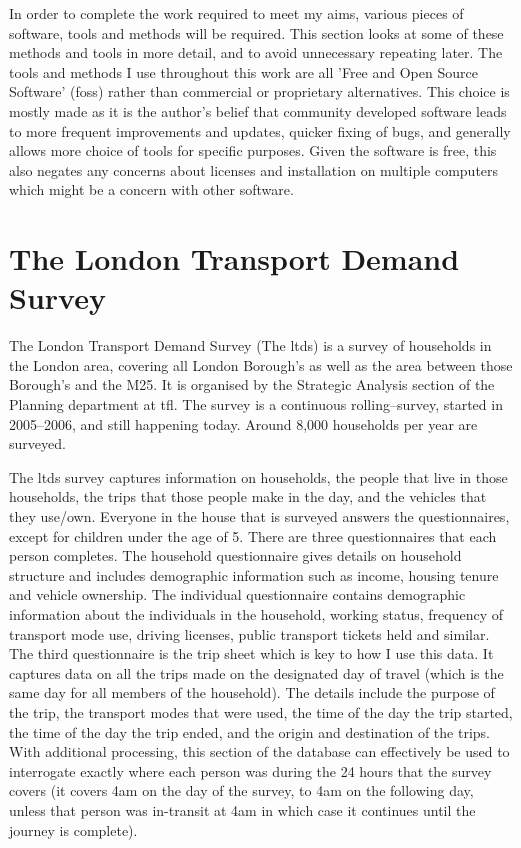 In order to complete the work required to meet my aims, various pieces of software, tools and methods will be required. This section looks at some of these methods and tools in more detail, and to avoid unnecessary repeating later. The tools and methods I use throughout this work are all 'Free and Open Source Software' (\gls{foss}) rather than commercial or proprietary alternatives. This choice is mostly made as it is the author’s belief that community developed software leads to more frequent improvements and updates, quicker fixing of bugs, and generally allows more choice of tools for specific purposes. Given the software is free, this also negates any concerns about licenses and installation on multiple computers which might be a concern with other software.


\section{The London Transport Demand Survey}
\label{sec:the_ltds}

The London Transport Demand Survey (The \gls{ltds}) is a survey of households in the London area, covering all London Borough's as well as the area between those Borough's and the M25. It is organised by the Strategic Analysis section of the Planning department at \gls{tfl}. The survey is a continuous rolling--survey, started in 2005--2006, and still happening today. Around 8,000 households per year are surveyed.

The \gls{ltds} survey captures information on households, the people that live in those households, the trips that those people make in the day, and the vehicles that they use/own. Everyone in the house that is surveyed answers the questionnaires, except for children under the age of 5. There are three questionnaires that each person completes. The household questionnaire gives details on household structure and includes demographic information such as income, housing tenure and vehicle ownership. The individual questionnaire contains demographic information about the individuals in the household, working status, frequency of transport mode use, driving licenses, public transport tickets held and similar. The third questionnaire is the trip sheet which is key to how I use this data. It captures data on all the trips made on the designated day of travel (which is the same day for all members of the household). The details include the purpose of the trip, the transport modes that were used, the time of the day the trip started, the time of the day the trip ended, and the origin and destination of the trips. With additional processing, this section of the database can effectively be used to interrogate exactly where each person was during the 24 hours that the survey covers (it covers 4am on the day of the survey, to 4am on the following day, unless that person was in-transit at 4am in which case it continues until the journey is complete).

